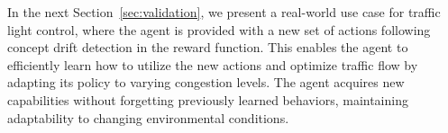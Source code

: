 In the next Section~\ref{sec:validation}, we present a real-world use case for traffic light control, where the agent is provided with a new set of actions following concept drift detection in the reward function. This enables the agent to efficiently learn how to utilize the new actions and optimize traffic flow by adapting its policy to varying congestion levels. The agent acquires new capabilities without forgetting previously learned behaviors, maintaining adaptability to changing environmental conditions.

\endinput

